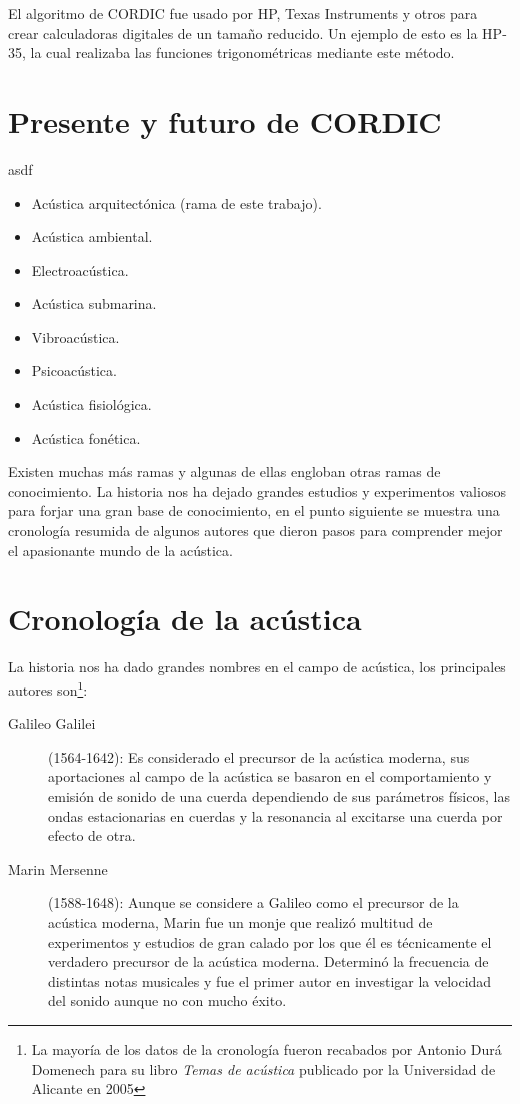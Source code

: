 El algoritmo de CORDIC fue usado por HP, Texas Instruments y otros para crear calculadoras digitales de un tamaño reducido. Un ejemplo de esto es la HP-35, la cual realizaba las funciones trigonométricas mediante este método.

\section{Presente y futuro de CORDIC}
asdf


\begin{itemize}
  \item Acústica arquitectónica (rama de este trabajo).
  \item Acústica ambiental.
  \item Electroacústica.
  \item Acústica submarina.
  \item Vibroacústica.
  \item Psicoacústica.
  \item Acústica fisiológica.
  \item Acústica fonética.
\end{itemize}

Existen muchas más ramas y algunas de ellas engloban otras ramas de conocimiento. La historia nos ha dejado grandes estudios y experimentos valiosos para forjar una gran base de conocimiento, en el punto siguiente se muestra una cronología resumida de algunos autores que dieron pasos para comprender mejor el apasionante mundo de la acústica.

\section{Cronología de la acústica}

La historia nos ha dado grandes nombres en el campo de acústica, los principales autores son\footnote{La mayoría de los datos de la cronología fueron recabados por Antonio Durá Domenech para su libro \textit{Temas de acústica} publicado por la Universidad de Alicante en 2005}:

\begin{description}
  \item[Galileo Galilei](1564-1642): Es considerado el precursor de la acústica moderna, sus aportaciones al campo de la acústica se basaron en el comportamiento y emisión de sonido de una cuerda dependiendo de sus parámetros físicos, las ondas estacionarias en cuerdas y la resonancia al excitarse una cuerda por efecto de otra.
  \item[Marin Mersenne](1588-1648): Aunque se considere a Galileo como el precursor de la acústica moderna, Marin fue un monje que realizó multitud de experimentos y estudios de gran calado por los que él es técnicamente el verdadero precursor de la acústica moderna. Determinó la frecuencia de distintas notas musicales y fue el primer autor en investigar la velocidad del sonido aunque no con mucho éxito.
  \end{description}
  


